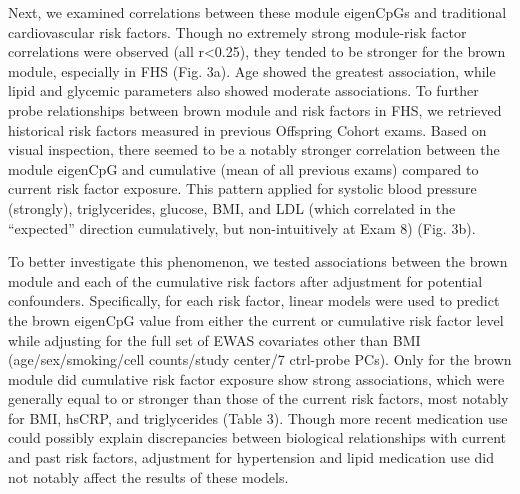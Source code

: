\documentclass[]{article}
\theoremstyle{definition}
\theoremstyle{definition}
\theoremstyle{definition}
\theoremstyle{remark}
\begin{document}
Next, we examined correlations between these module eigenCpGs and
traditional cardiovascular risk factors. Though no extremely strong
module-risk factor correlations were observed (all
\textbar{}r\textbar{}\textless{}0.25), they tended to be stronger for
the brown module, especially in FHS (Fig. 3a). Age showed the greatest
association, while lipid and glycemic parameters also showed moderate
associations. To further probe relationships between brown module and
risk factors in FHS, we retrieved historical risk factors measured in
previous Offspring Cohort exams. Based on visual inspection, there
seemed to be a notably stronger correlation between the module eigenCpG
and cumulative (mean of all previous exams) compared to current risk
factor exposure. This pattern applied for systolic blood pressure
(strongly), triglycerides, glucose, BMI, and LDL (which correlated in
the ``expected'' direction cumulatively, but non-intuitively at Exam 8)
(Fig. 3b).

To better investigate this phenomenon, we tested associations between
the brown module and each of the cumulative risk factors after
adjustment for potential confounders. Specifically, for each risk
factor, linear models were used to predict the brown eigenCpG value
from either the current or cumulative risk factor level while adjusting
for the full set of EWAS covariates other than BMI (age/sex/smoking/cell
counts/study center/7 ctrl-probe PCs). Only for the brown module did
cumulative risk factor exposure show strong associations, which were
generally equal to or stronger than those of the current risk factors,
most notably for BMI, hsCRP, and triglycerides (Table 3). Though more
recent medication use could possibly explain discrepancies between
biological relationships with current and past risk factors, adjustment
for hypertension and lipid medication use did not notably affect the
results of these models.
\end{document}
